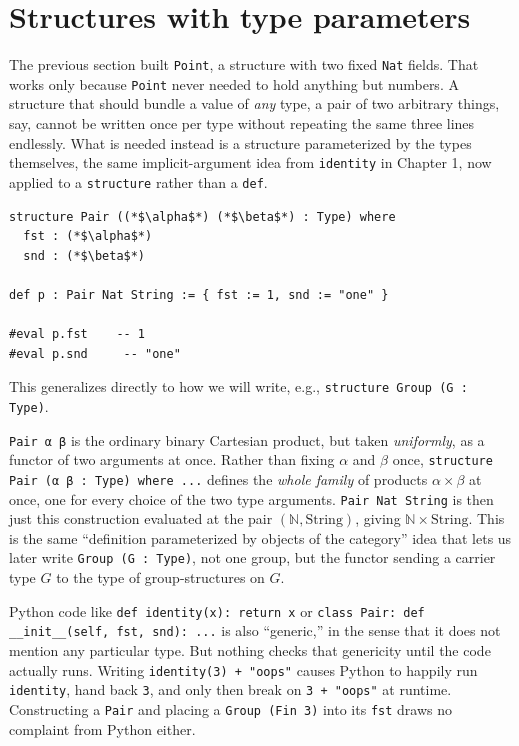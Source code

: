 \section{Structures with type parameters}\label{sec:03-functions-and-structures:02-type-parameters:1}

The previous section built \texttt{Point}, a structure with two fixed \texttt{Nat} fields. That works only because \texttt{Point} never needed to hold anything but numbers. A structure that should bundle a value of \emph{any} type, a pair of two arbitrary things, say, cannot be written once per type without repeating the same three lines endlessly. What is needed instead is a structure parameterized by the types themselves, the same implicit-argument idea from \texttt{identity} in Chapter 1, now applied to a \texttt{structure} rather than a \texttt{def}.

\begin{lstlisting}
structure Pair ((*$\alpha$*) (*$\beta$*) : Type) where
  fst : (*$\alpha$*)
  snd : (*$\beta$*)

def p : Pair Nat String := { fst := 1, snd := "one" }

#eval p.fst    -- 1
#eval p.snd     -- "one"
\end{lstlisting}

This generalizes directly to how we will write, e.g., \texttt{structure Group (G : Type)}.

\begin{mathreading}

\texttt{Pair α β} is the ordinary binary Cartesian product, but taken \emph{uniformly}, as a functor of two arguments at once. Rather than fixing \(\alpha\) and \(\beta\) once, \texttt{structure Pair (α β : Type) where ...} defines the \emph{whole family} of products \(\alpha \times \beta\) at once, one for every choice of the two type arguments. \texttt{Pair Nat String} is then just this construction evaluated at the pair \((\mathbb{N},
\mathrm{String})\), giving \(\mathbb{N} \times \mathrm{String}\). This is the same ``definition parameterized by objects of the category'' idea that lets us later write \texttt{Group (G : Type)}, not one group, but the functor sending a carrier type \(G\) to the type of group-structures on \(G\).

\end{mathreading}

\begin{progcorner}

Python code like \texttt{def identity(x): return x} or \texttt{class Pair: def \_\allowbreak{}\_\allowbreak{}init\_\allowbreak{}\_\allowbreak{}(self, fst, snd): ...} is also ``generic,'' in the sense that it does not mention any particular type. But nothing checks that genericity until the code actually runs. Writing \texttt{identity(3) + "oops"} causes Python to happily run \texttt{identity}, hand back \texttt{3}, and only then break on \texttt{3 + "oops"} at runtime. Constructing a \texttt{Pair} and placing a \texttt{Group (Fin 3)} into its \texttt{fst} draws no complaint from Python either.

\end{progcorner}

